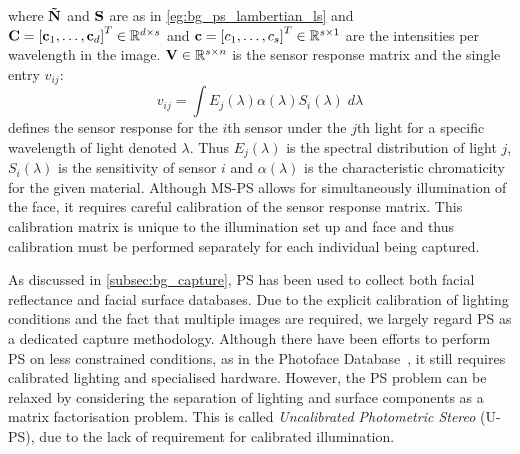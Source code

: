 where $\boldsymbol{\mathbf{\tilde{N}}}$ and $\boldsymbol{\mathbf{S}}$ are as in \cref{eg:bg_ps_lambertian_ls}
and $\boldsymbol{\mathbf{C}} = {[\boldsymbol{\mathbf{c}}_1, \ldots, \boldsymbol{\mathbf{c}}_d]}^T \in \mathbb{R}^{d \times s}$ and
$\boldsymbol{\mathbf{c}} = {[c_1, \ldots, c_s]}^T \in \mathbb{R}^{s \times 1}$ are the intensities
per wavelength in the image. $\boldsymbol{\mathbf{V}} \in \mathbb{R}^{s \times n}$ is the sensor
response matrix and the single entry $v_{ij}$:
\begin{equation}\label{eg:bg_ps_sensor_response}
	v_{ij} = \int E_j(\lambda) \alpha(\lambda) S_i(\lambda) \; d\lambda
\end{equation}
defines the sensor response for the $i$th sensor under the $j$th light for
a specific wavelength of light denoted $\lambda$. Thus $E_j(\lambda)$ is the
spectral distribution of light $j$, $S_i(\lambda)$ is the sensitivity
of sensor $i$ and $\alpha(\lambda)$ is the characteristic chromaticity for the
given material. Although MS-PS allows for simultaneously illumination of the
face, it requires careful calibration of the sensor response matrix. This
calibration matrix is unique to the illumination set up and face and thus
calibration must be performed separately for each individual
being captured.

As discussed in \cref{subsec:bg_capture}, PS has been used to collect both
facial reflectance and facial surface databases. Due to the explicit
calibration of lighting conditions and the fact that multiple images are
required, we largely regard PS as a dedicated capture methodology. Although
there have been efforts to perform PS on less constrained conditions, as in
the Photoface Database~\cite{RefWorks:293}, it still requires calibrated
lighting and specialised hardware. However, the PS problem can be relaxed by
considering the separation of lighting and surface components as a matrix
factorisation problem. This is called
\textit{Uncalibrated Photometric Stereo} (U-PS), due to the lack of
requirement for calibrated illumination.
